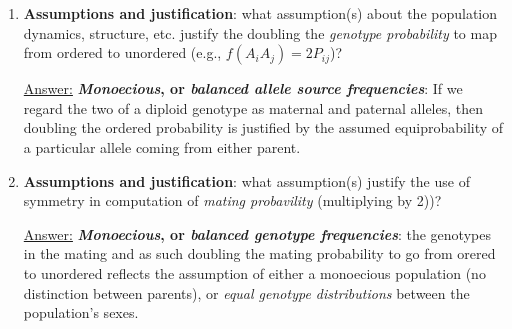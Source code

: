 \documentclass{article}
\newenvironment{QandA}{\begin{enumerate}[label=\bfseries Q\arabic*.]}
                       {\end{enumerate}}
\newenvironment{answered}{\par\normalfont\underline{Answer:}}{}
\begin{document}
\begin{QandA}
\begin{answered}
    \end{answered}
  \item{\textbf{Assumptions and justification}: what assumption(s) about the population dynamics, structure, etc. justify the doubling the \textit{genotype probability} to map from ordered to unordered (e.g., $f(A_i A_j) = 2P_{ij}$)?}
    \begin{answered}
    \textbf{\textit{Monoecious}, or \textit{balanced allele source frequencies}}: If we regard the two  of a diploid genotype as maternal and paternal alleles, then doubling the ordered probability is justified by the assumed equiprobability of a particular allele coming from either parent.
    \end{answered}
  \item{\textbf{Assumptions and justification}: what assumption(s) justify the use of symmetry in computation of \textit{mating probavility} (multiplying by 2))?}
    \begin{answered}
    \textbf{\textit{Monoecious}, or \textit{balanced genotype frequencies}}:  the genotypes in the mating and as such doubling the mating probability to go from orered to unordered reflects the assumption of either a monoecious population (no distinction between parents), or \textit{equal genotype distributions} between the population's sexes.
    \end{answered}
\end{QandA}
\end{document}
